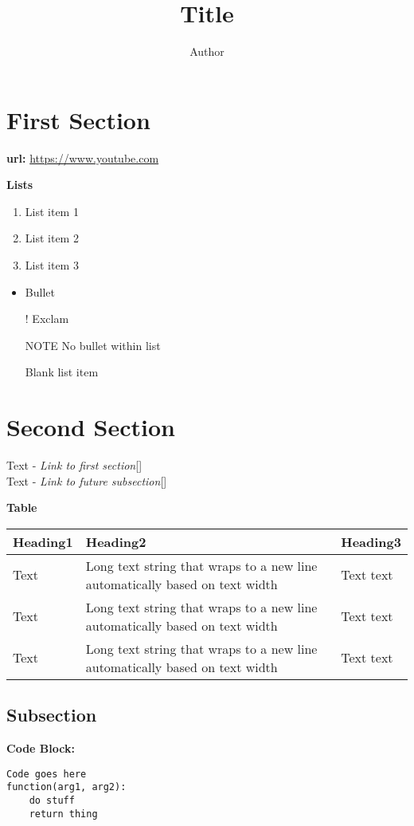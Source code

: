 \documentclass{article}
\title{Title}
\author{Author}
\newcommand{\ms}{\medskip}
\newcommand{\bs}{\bigskip}
\begin{document}
\maketitle
\tableofcontents


\section*{First Section}
\label{s:first}

\textbf{url:}
\url{https://www.youtube.com}

\textbf{Lists}
\begin{enumerate}
    \item List item 1
    \item List item 2
    \item List item 3
\end{enumerate}

\begin{itemize}
    \item Bullet
    \item[!] Exclam
    \item[NOTE] No bullet within list
    \item[] Blank list item
\end{itemize}

\section*{Second Section}
\label{s:second}

Text - \textit{Link to first section}[]\\
Text - \textit{Link to future subsection}[]\ms %

\textbf{Table}\\
\begin{tabularx}{\textwidth}{ | >{\hsize}Y | Y | >{\hsize}Y | }
    \hline
    Heading1 & Heading2 & Heading3 \\
    \hline
    Text & Long text string that wraps to a new line automatically based on text width & Text text \\
    \hline
    Text & Long text string that wraps to a new line automatically based on text width & Text text \\
    \hline
    Text & Long text string that wraps to a new line automatically based on text width & Text text \\
    \hline
\end{tabularx}\bs


\subsection*{Subsection}
\label{ss:subsection}

\textbf{Code Block:}
\begin{lstlisting}
Code goes here
function(arg1, arg2):
    do stuff
    return thing
\end{lstlisting}
\end{document}
